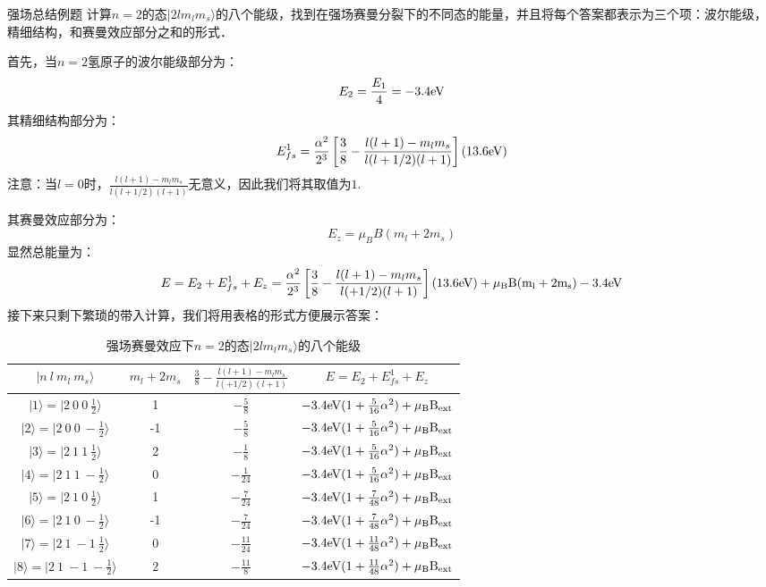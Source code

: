 \begin{example}{强场总结例题}
计算$n=2$的态$|2lm_lm_s\rangle$的八个能级，找到在强场赛曼分裂下的不同态的能量，并且将每个答案都表示为三个项：波尔能级，精细结构，和赛曼效应部分之和的形式．

首先，当$n=2$氢原子的波尔能级部分为：
\begin{equation}
E_2=\frac{E_1}{4}=-3.4\rm{eV}
\end{equation}
其精细结构部分为：
\begin{equation}
E_{fs}^1=\frac{\alpha^2}{2^3}\left[\frac{3}{8}-\frac{l(l+1)-m_lm_s}{l(l+1/2)(l+1)}\right](13.6 \rm{eV})
\end{equation}
注意：当$l=0$时，$\frac{l(l+1)-m_lm_s}{l(l+1/2)(l+1)}$无意义，因此我们将其取值为$1$.

其赛曼效应部分为：
\begin{equation}
E_z =\mu_BB(m_l+2m_s)
\end{equation}
显然总能量为：
\begin{equation}
E=E_2+E_{fs}^1+E_z = \frac{\alpha^2}{2^3}\left[\frac{3}{8}-\frac{l(l+1)-m_lm_s}{l(+1/2)(l+1)}\right](13.6 \rm{eV})+\mu_BB(m_l+2m_s)-3.4 \rm{eV}
\end{equation}
接下来只剩下繁琐的带入计算，我们将用表格的形式方便展示答案：
\begin{table}[ht]
\centering
\caption{强场赛曼效应下$n=2$的态$|2lm_lm_s\rangle$的八个能级}\label{ZemEff_tab1}
\begin{tabular}{|c|c|c|c|}
\hline
$|n \ l \ m_l \ m_s\rangle$& $m_l+2m_s$ & $\frac{3}{8}-\frac{l(l+1)-m_lm_s}{l(+1/2)(l+1)}$ & $E=E_2+E_{fs}^1+E_z $ \\
\hline
$|1\rangle = |2\ 0 \ 0 \ \frac{1}{2}\rangle$ & 1 & $-\frac{5}{8}$ & $-3.4 \rm{eV}(1+\frac{5}{16}\alpha^2)+\mu_BB_{ext}$ \\
\hline
$|2\rangle = |2\ 0 \ 0 \ -\frac{1}{2}\rangle$ & -1 & $-\frac{5}{8}$ & $-3.4 \rm{eV}(1+\frac{5}{16}\alpha^2)+\mu_BB_{ext}$ \\
\hline
$|3\rangle = |2\ 1 \ 1 \ \frac{1}{2}\rangle$ & 2 & $-\frac{1}{8}$ & $-3.4 \rm{eV}(1+\frac{5}{16}\alpha^2)+\mu_BB_{ext}$ \\
\hline
$|4\rangle = |2\ 1 \ 1 \ -\frac{1}{2}\rangle$ & 0 & $-\frac{1}{24}$ & $-3.4 \rm{eV}(1+\frac{5}{16}\alpha^2)+\mu_BB_{ext}$ \\
\hline
$|5\rangle = |2\ 1 \ 0 \ \frac{1}{2}\rangle$ & 1 & $-\frac{7}{24}$ & $-3.4 \rm{eV}(1+\frac{7}{48}\alpha^2)+\mu_BB_{ext}$ \\
\hline
$|6\rangle = |2\ 1 \ 0 \ -\frac{1}{2}\rangle$ & -1 & $-\frac{7}{24}$ & $-3.4 \rm{eV}(1+\frac{7}{48}\alpha^2)+\mu_BB_{ext}$ \\
\hline
$|7\rangle = |2\ 1 \ -1 \ \frac{1}{2}\rangle$ & 0 & $-\frac{11}{24}$ & $-3.4 \rm{eV}(1+\frac{11}{48}\alpha^2)+\mu_BB_{ext}$ \\
\hline
$|8\rangle = |2\ 1 \ -1 \ -\frac{1}{2}\rangle$ & 2 & $-\frac{11}{8}$ & $-3.4 \rm{eV}(1+\frac{11}{48}\alpha^2)+\mu_BB_{ext}$ \\
\hline
\end{tabular}
\end{table}
\end{example}
